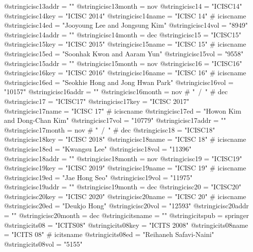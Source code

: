 @string{icisc13addr =           ""}
@string{icisc13month =          nov}
@string{icisc14 =               "ICISC14"}
@string{icisc14key =            "ICISC 2014"}
@string{icisc14name =           "ICISC 14" # iciscname}
@string{icisc14ed =             "Jooyoung Lee and Jongsung Kim"}
@string{icisc14vol =            "8949"}
@string{icisc14addr =           ""}
@string{icisc14month =          dec}
@string{icisc15 =               "ICISC15"}
@string{icisc15key =            "ICISC 2015"}
@string{icisc15name =           "ICISC 15" # iciscname}
@string{icisc15ed =             "Soonhak Kwon and Aaram Yun"}
@string{icisc15vol =            "9558"}
@string{icisc15addr =           ""}
@string{icisc15month =          nov}
@string{icisc16 =               "ICISC16"}
@string{icisc16key =            "ICISC 2016"}
@string{icisc16name =           "ICISC 16" # iciscname}
@string{icisc16ed =             "Seokhie Hong and Jong Hwan Park"}
@string{icisc16vol =            "10157"}
@string{icisc16addr =           ""}
@string{icisc16month =          nov # "~/~" # dec}
@string{icisc17 =               "ICISC17"}
@string{icisc17key =            "ICISC 2017"}
@string{icisc17name =           "ICISC 17" # iciscname}
@string{icisc17ed =             "Howon Kim and Dong-Chan Kim"}
@string{icisc17vol =            "10779"}
@string{icisc17addr =           ""}
@string{icisc17month =          nov # "~/~" # dec}
@string{icisc18 =               "ICISC18"}
@string{icisc18key =            "ICISC 2018"}
@string{icisc18name =           "ICISC 18" # iciscname}
@string{icisc18ed =             "Kwangsu Lee"}
@string{icisc18vol =            "11396"}
@string{icisc18addr =           ""}
@string{icisc18month =          nov}
@string{icisc19 =               "ICISC19"}
@string{icisc19key =            "ICISC 2019"}
@string{icisc19name =           "ICISC 19" # iciscname}
@string{icisc19ed =             "Jae Hong Seo"}
@string{icisc19vol =            "11975"}
@string{icisc19addr =           ""}
@string{icisc19month =          dec}
@string{icisc20 =               "ICISC20"}
@string{icisc20key =            "ICISC 2020"}
@string{icisc20name =           "ICISC 20" # iciscname}
@string{icisc20ed =             "Deukjo Hong"}
@string{icisc20vol =            "12593"}
@string{icisc20addr =           ""}
@string{icisc20month =          dec}
@string{icitsname =             ""}
@string{icitspub =              springer}
@string{icits08 =               "ICITS08"}
@string{icits08key =            "ICITS 2008"}
@string{icits08name =           "ICITS 08" # icitsname}
@string{icits08ed =             "Reihaneh Safavi-Naini"}
@string{icits08vol =            "5155"}
